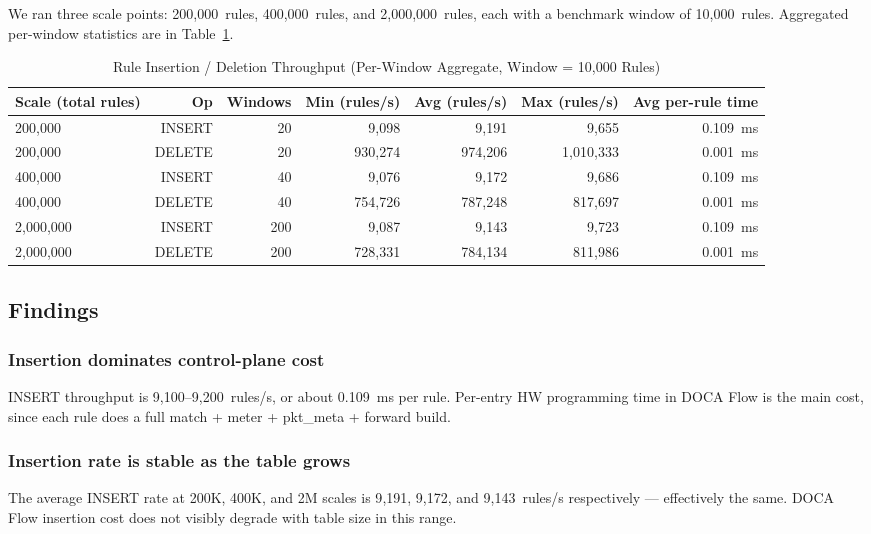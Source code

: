 \documentclass[conference]{IEEEtran}
\begin{document}
We ran three scale points: 200{,}000~rules, 400{,}000~rules, and
2{,}000{,}000~rules, each with a benchmark window of 10{,}000~rules.
Aggregated per-window statistics are in Table~\ref{tab:bench}.

\begin{table}[t]
  \centering
  \caption{Rule Insertion / Deletion Throughput (Per-Window Aggregate, Window = 10{,}000 Rules)}
  \label{tab:bench}
  \begin{tabular}{@{}lrrrrrr@{}}
    \toprule
    Scale (total rules) & Op     & Windows & Min (rules/s) & Avg (rules/s) & Max (rules/s) & Avg per-rule time \\
    \midrule
    200{,}000   & INSERT & 20  & 9{,}098    & 9{,}191    & 9{,}655      & 0.109~ms \\
    200{,}000   & DELETE & 20  & 930{,}274  & 974{,}206  & 1{,}010{,}333 & 0.001~ms \\
    \midrule
    400{,}000   & INSERT & 40  & 9{,}076    & 9{,}172    & 9{,}686      & 0.109~ms \\
    400{,}000   & DELETE & 40  & 754{,}726  & 787{,}248  & 817{,}697    & 0.001~ms \\
    \midrule
    2{,}000{,}000 & INSERT & 200 & 9{,}087  & 9{,}143    & 9{,}723      & 0.109~ms \\
    2{,}000{,}000 & DELETE & 200 & 728{,}331 & 784{,}134 & 811{,}986    & 0.001~ms \\
    \bottomrule
  \end{tabular}
\end{table}

\subsection{Findings}

\subsubsection{Insertion dominates control-plane cost}
INSERT throughput is 9{,}100--9{,}200~rules/s, or about 0.109~ms per
rule.  Per-entry HW programming time in DOCA Flow is the main cost,
since each rule does a full match + meter + pkt\_meta + forward build.

\subsubsection{Insertion rate is stable as the table grows}
The average INSERT rate at 200K, 400K, and 2M scales is 9{,}191,
9{,}172, and 9{,}143~rules/s respectively --- effectively the same.
DOCA Flow insertion cost does not visibly degrade with table size in
this range.
\end{document}

